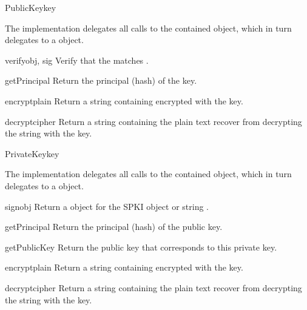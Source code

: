 \documentclass{howto}
\begin{document}
\begin{classdesc}{PublicKey}{key}

The implementation delegates all calls to the contained
 object, which in turn delegates to a
 object.

\begin{methoddesc}{verify}{obj, sig}
Verify that the   matches .
\end{methoddesc}

\begin{methoddesc}{getPrincipal}{}
Return the principal (hash) of the key.
\end{methoddesc}

\begin{methoddesc}{encrypt}{plain}
Return a string containing  encrypted with the key.
\end{methoddesc}

\begin{methoddesc}{decrypt}{cipher}
Return a string containing the plain text recover from decrypting the
string  with the key.
\end{methoddesc}

\end{classdesc}

\begin{classdesc}{PrivateKey}{key}

The implementation delegates all calls to the contained
 object, which in turn delegates to a
 object.

\begin{methoddesc}{sign}{obj}
Return a  object for the SPKI object or string
. 
\end{methoddesc}

\begin{methoddesc}{getPrincipal}{}
Return the principal (hash) of the public key.
\end{methoddesc}

\begin{methoddesc}{getPublicKey}{}
Return the public key that corresponds to this private key.
\end{methoddesc}

\begin{methoddesc}{encrypt}{plain}
Return a string containing  encrypted with the key.
\end{methoddesc}

\begin{methoddesc}{decrypt}{cipher}
Return a string containing the plain text recover from decrypting the
string  with the key.
\end{methoddesc}

\end{classdesc}
\end{document}
